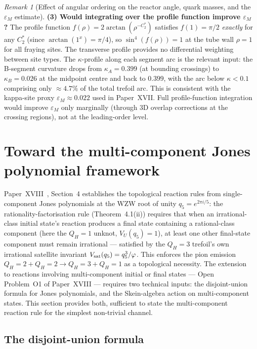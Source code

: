 \documentclass[11pt,a4paper]{article}
\theoremstyle{definition}\newtheorem{definition}[theorem]{Definition}
\theoremstyle{remark}
\newtheorem{remark}[theorem]{Remark}
\newcommand{\vp}{\varphi}
\newcommand{\QH}{Q_H}
\newcommand{\Jones}{V}
\begin{document}
\begin{remark}[Effect of angular ordering on the reactor angle, quark masses,
  and the $\varepsilon_M$ estimate]
\textbf{(3) Would integrating over the profile function improve $\varepsilon_M$?}
The profile function $f(\rho)=2\arctan(\rho^{-C_2^*})$ satisfies
$f(1)=\pi/2$ \emph{exactly} for any $C_2^*$ (since $\arctan(1^x)=\pi/4$),
so $\sin^4(f(\rho))=1$ at the tube wall $\rho=1$ for all fraying sites.
The transverse profile provides no differential weighting between site
types.  The $\kappa$-profile along each segment arc is the relevant input:
the B-segment curvature drops from $\kappa_A=0.399$ (at bounding
crossings) to $\kappa_B=0.026$ at the midpoint centre and back to
$0.399$, with the arc below $\kappa<0.1$ comprising only
$\approx4.7\%$ of the total trefoil arc.  This is consistent with the
kappa-site proxy $\varepsilon_M\approx0.022$ used in Paper~XVII.
Full profile-function integration would improve $\varepsilon_M$ only
marginally (through 3D overlap corrections at the crossing regions),
not at the leading-order level.
\end{remark}

\section{Toward the multi-component Jones polynomial framework}
\label{P19:sec:multi_component_jones}

Paper~XVIII~\cite{Paper18}, Section~4 establishes the topological
reaction rules from single-component Jones polynomials at the WZW
root of unity $q_5=e^{2\pi i/5}$: the rationality-factorisation rule
(Theorem~4.1(ii)) %
requires that when an irrational-class initial state's reaction
produces a final state containing a rational-class component (here
the $\QH=1$ unknot, $\Jones_U(q_5)=1$), at least one other
final-state component must remain irrational --- satisfied by the
$\QH=3$ trefoil's own irrational satellite invariant
$\Jones_{\rm sat}(q_5)=q_5^3/\vp$.  This enforces the pion emission
$\QH=2+\QH=2\to\QH=3+\QH=1$ as a topological necessity.  The
extension to reactions involving multi-component initial or final
states --- Open Problem~O1 of Paper~XVIII --- requires two
technical inputs: the disjoint-union formula for Jones polynomials,
and the Skein-algebra action on multi-component states.  This
section provides both, sufficient to state the multi-component
reaction rule for the simplest non-trivial channel.

\subsection{The disjoint-union formula}
\end{document}
